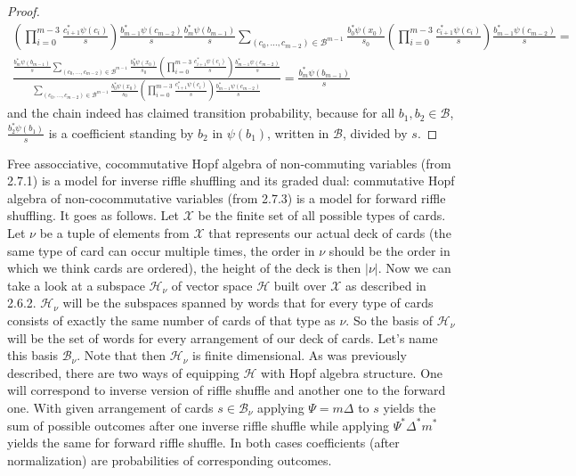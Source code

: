 \documentclass[a4paper, 12pt]{article}
\newcommand{\ndotsm}[3]{{#1}_{#2}, \dots, {#1}_{#3}}
\begin{document}
\begin{proof}
\begin{gather*}
{\left(\displaystyle\prod_{i = 0}^{m-3}\frac{c_{i+1}^*\psi(c_i)}{s}\right)\frac{b_{m-1}^*\psi(c_{m-2})}{s}
\frac{b_m^*\psi(b_{m-1})}{s}}{\displaystyle\sum_{(\ndotsm{c}{0}{m-2}) \in \mathcal{B}^{m-1}}
\frac{b_0^*\psi(x_0)}{s_0}
\left(\prod_{i= 0}^{m-3}\frac{c_{i+1}^*
\psi(c_i)}{s}\right)\frac{b_{m-1}^*\psi(c_{m-2})}{s}} = \\[16pt]
\frac{\frac{b_m^*\psi(b_{m-1})}{s}\displaystyle\sum_{(c_0, \dots, c_{m-2}) \in \mathcal{B}^{m-1}}
\frac{b_0^*\psi(x_0)}{s_0}
\left(\displaystyle\prod_{i = 0}^{m-3}\frac{c_{i+1}^*\psi(c_i)}{s}\right)\frac{b_{m-1}^*\psi(c_{m-2})}{s}}
{\displaystyle\sum_{(\ndotsm{c}{0}{m-2}) \in \mathcal{B}^{m-1}}\frac{b_0^*\psi(x_0)}{s_0}
\left(\prod_{i= 0}^{m-3}\frac{c_{i+1}^*
\psi(c_i)}{s}\right)\frac{b_{m-1}^*\psi(c_{m-2})}{s}} = \frac{b_m^*\psi(b_{m-1})}{s}
\end{gather*}
and the chain indeed has claimed transition probability, because for all $b_1, b_2 \in \mathcal{B}$,
 $\frac{b_2^*\psi(b_1)}{s}$ is a coefficient
standing by $b_2$ in $\psi(b_1)$, written in $\mathcal{B}$, divided by $s$.
\end{proof}

Free assocciative, cocommutative Hopf algebra of non-commuting variables (from 2.7.1) is a model for inverse
riffle shuffling and its graded dual: commutative
Hopf algebra of non-cocommutative variables (from 2.7.3) is a model for forward riffle shuffling.
It goes as follows.
Let $\mathcal{X}$ be the finite set of all possible types of cards. Let $\nu$ be a tuple of
elements from $\mathcal{X}$ that represents our actual deck of cards (the same type of card can occur
multiple times, the order in $\nu$ should be the order in which we think cards are ordered), the height of
the deck is then $|\nu|$. Now we can take a look at a subspace $\mathcal{H}_\nu$ of vector space
$\mathcal{H}$ built over $\mathcal{X}$ as described in 2.6.2. $\mathcal{H}_\nu$ will be the subspaces
spanned by words that for every type of cards consists of exactly the same number of cards of that type as
$\nu$. So the basis of $\mathcal{H}_\nu$ will be the set of words for every arrangement of our deck of cards.
Let's name this basis $\mathcal{B}_\nu$. Note that then $\mathcal{H}_\nu$ is finite dimensional.
As was previously described, there are two ways of equipping $\mathcal{H}$ with Hopf algebra structure.
One will correspond to inverse version of riffle shuffle and another one to the forward one. With given
arrangement of cards $s \in \mathcal{B}_\nu$ applying $\Psi = m\Delta$ to $s$ yields the sum of possible outcomes
after one inverse riffle shuffle while applying $\Psi^*\Delta^*m^*$ yields the same for forward riffle shuffle.
In both cases coefficients (after normalization) are probabilities of corresponding outcomes. \\[4pt]
\end{document}

